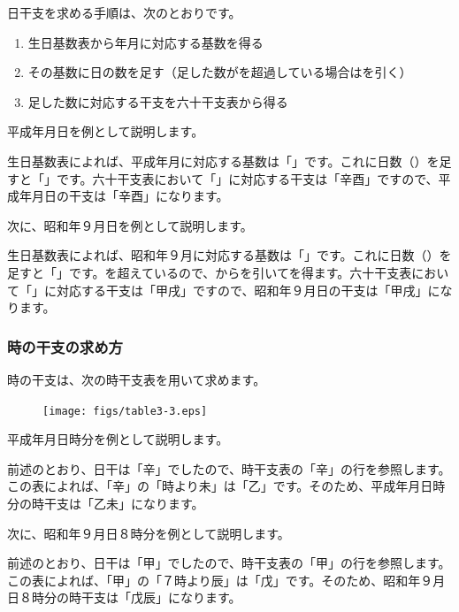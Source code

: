 \documentclass[a5paper,11pt,dvipdfmx]{tarticle}
\begin{document}
日干支を求める手順は、次のとおりです。

\begin{enumerate}
\item 生日基数表から年月に対応する基数を得る
\item その基数に日の数を足す（足した数がを超過している場合はを引く）
\item 足した数に対応する干支を六十干支表から得る
\end{enumerate}

平成年月日を例として説明します。

生日基数表によれば、平成年月に対応する基数は「」です。これに日数（）を足すと「」です。六十干支表において「」に対応する干支は「辛酉」ですので、平成年月日の干支は「辛酉」になります。

次に、昭和年９月日を例として説明します。

生日基数表によれば、昭和年９月に対応する基数は「」です。これに日数（）を足すと「」です。を超えているので、からを引いてを得ます。六十干支表において「」に対応する干支は「甲戌」ですので、昭和年９月日の干支は「甲戌」になります。


\subsubsection*{時の干支の求め方}

時の干支は、次の時干支表を用いて求めます。

\begin{figure}[h]
  \centering
  \texttt{[image: figs/table3-3.eps]}
\end{figure}

平成年月日時分を例として説明します。

前述のとおり、日干は「辛」でしたので、時干支表の「辛」の行を参照します。この表によれば、「辛」の「時より未」は「乙」です。そのため、平成年月日時分の時干支は「乙未」になります。

次に、昭和年９月日８時分を例として説明します。

前述のとおり、日干は「甲」でしたので、時干支表の「甲」の行を参照します。この表によれば、「甲」の「７時より辰」は「戊」です。そのため、昭和年９月日８時分の時干支は「戊辰」になります。
\end{document}
